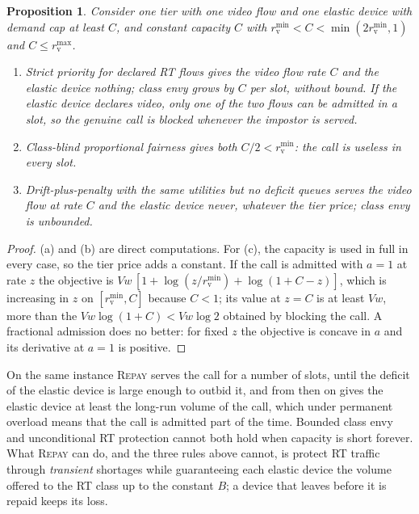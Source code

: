\documentclass[preprint,11pt]{elsarticle}
\newtheorem{proposition}{Proposition}
\theoremstyle{definition}
\theoremstyle{remark}
\newcommand{\rmin}{r^{\min}}
\newcommand{\rmax}{r^{\max}}
\newcommand{\repay}{\textsc{Repay}}
\begin{document}
\begin{proposition}\label{prop:baselines}
Consider one tier with one video flow and one elastic device with demand cap at least $C$, and constant capacity $C$ with $\rmin_{\mathrm{v}}<C<\min(2\rmin_{\mathrm{v}},1)$ and $C\le\rmax_{\mathrm{v}}$.
\begin{enumerate}[label=(\alph*),nosep]
\item Strict priority for declared RT flows gives the video flow rate $C$ and the elastic device nothing; class envy grows by $C$ per slot, without bound. If the elastic device declares video, only one of the two flows can be admitted in a slot, so the genuine call is blocked whenever the impostor is served.
\item Class-blind proportional fairness gives both $C/2<\rmin_{\mathrm{v}}$: the call is useless in every slot.
\item Drift-plus-penalty with the same utilities but no deficit queues serves the video flow at rate $C$ and the elastic device never, whatever the tier price; class envy is unbounded.
\end{enumerate}
\end{proposition}
\begin{proof}
(a) and (b) are direct computations. For (c), the capacity is used in full in every case, so the tier price adds a constant. If the call is admitted with $a=1$ at rate $z$ the objective is $Vw\,[1+\log(z/\rmin_{\mathrm{v}})+\log(1+C-z)]$, which is increasing in $z$ on $[\rmin_{\mathrm{v}},C]$ because $C<1$; its value at $z=C$ is at least $Vw$, more than the $Vw\log(1+C)<Vw\log 2$ obtained by blocking the call. A fractional admission does no better: for fixed $z$ the objective is concave in $a$ and its derivative at $a=1$ is positive.
\end{proof}

On the same instance \repay{} serves the call for a number of slots, until the deficit of the elastic device is large enough to outbid it, and from then on gives the elastic device at least the long-run volume of the call, which under permanent overload means that the call is admitted part of the time.
Bounded class envy and unconditional RT protection cannot both hold when capacity is short forever.
What \repay{} can do, and the three rules above cannot, is protect RT traffic through \emph{transient} shortages while guaranteeing each elastic device the volume offered to the RT class up to the constant $B$; a device that leaves before it is repaid keeps its loss.
\end{document}
